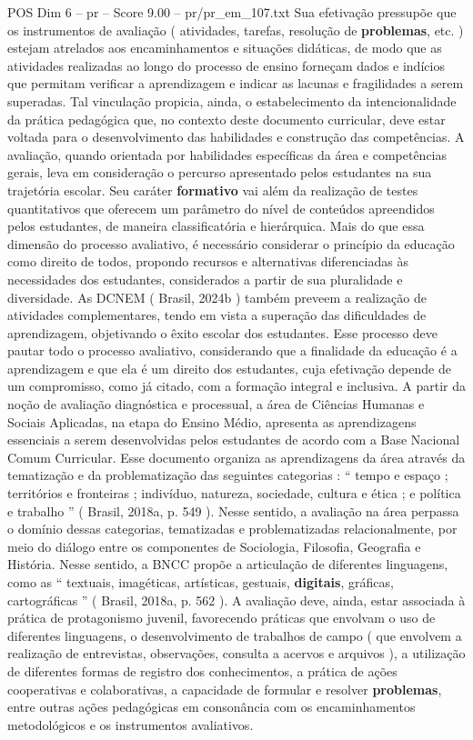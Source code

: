 \begin{textsample}{POS Dim 6 – pr – Score 9.00 – pr/pr\_em\_107.txt}
Sua efetivação pressupõe que os instrumentos de avaliação ( atividades, tarefas, resolução de \textbf{problemas}, etc. ) estejam atrelados aos encaminhamentos e situações didáticas, de modo que as atividades realizadas ao longo do processo de ensino forneçam dados e indícios que permitam verificar a aprendizagem e indicar as lacunas e fragilidades a serem superadas.
Tal vinculação propicia, ainda, o estabelecimento da intencionalidade da prática pedagógica que, no contexto deste documento curricular, deve estar voltada para o desenvolvimento das habilidades e construção das competências.
A avaliação, quando orientada por habilidades específicas da área e competências gerais, leva em consideração o percurso apresentado pelos estudantes na sua trajetória escolar.
Seu caráter \textbf{formativo} vai além da realização de testes quantitativos que oferecem um parâmetro do nível de conteúdos apreendidos pelos estudantes, de maneira classificatória e hierárquica.
Mais do que essa dimensão do processo avaliativo, é necessário considerar o princípio da educação como direito de todos, propondo recursos e alternativas diferenciadas às necessidades dos estudantes, considerados a partir de sua pluralidade e diversidade.
As DCNEM ( Brasil, 2024b ) também preveem a realização de atividades complementares, tendo em vista a superação das dificuldades de aprendizagem, objetivando o êxito escolar dos estudantes.
Esse processo deve pautar todo o processo avaliativo, considerando que a finalidade da educação é a aprendizagem e que ela é um direito dos estudantes, cuja efetivação depende de um compromisso, como já citado, com a formação integral e inclusiva.
A partir da noção de avaliação diagnóstica e processual, a área de Ciências Humanas e Sociais Aplicadas, na etapa do Ensino Médio, apresenta as aprendizagens essenciais a serem desenvolvidas pelos estudantes de acordo com a Base Nacional Comum Curricular.
Esse documento organiza as aprendizagens da área através da tematização e da problematização das seguintes categorias : “ tempo e espaço ; territórios e fronteiras ; indivíduo, natureza, sociedade, cultura e ética ; e política e trabalho ” ( Brasil, 2018a, p. 549 ).
Nesse sentido, a avaliação na área perpassa o domínio dessas categorias, tematizadas e problematizadas relacionalmente, por meio do diálogo entre os componentes de Sociologia, Filosofia, Geografia e História.
Nesse sentido, a BNCC propõe a articulação de diferentes linguagens, como as “ textuais, imagéticas, artísticas, gestuais, \textbf{digitais}, gráficas, cartográficas ” ( Brasil, 2018a, p. 562 ).
A avaliação deve, ainda, estar associada à prática de protagonismo juvenil, favorecendo práticas que envolvam o uso de diferentes linguagens, o desenvolvimento de trabalhos de campo ( que envolvem a realização de entrevistas, observações, consulta a acervos e arquivos ), a utilização de diferentes formas de registro dos conhecimentos, a prática de ações cooperativas e colaborativas, a capacidade de formular e resolver \textbf{problemas}, entre outras ações pedagógicas em consonância com os encaminhamentos metodológicos e os instrumentos avaliativos.

\end{textsample}
